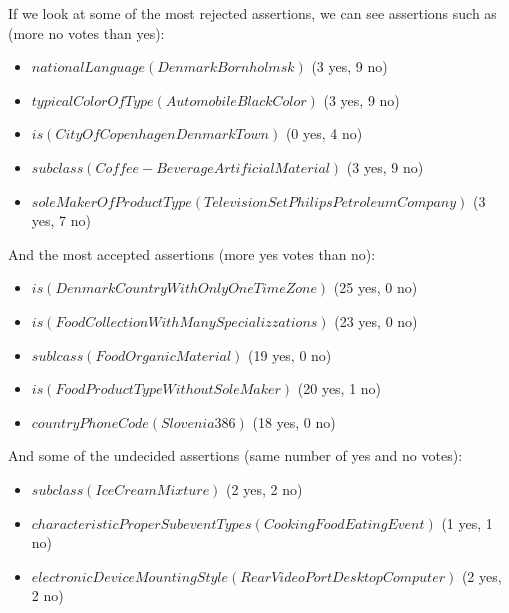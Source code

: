 {If we look at some of the most rejected assertions, we can see assertions 
such as (more no votes than yes):
\begin{itemize}
\item $nationalLanguage (Denmark Bornholmsk)$ (3 yes, 9 no)
\item $typicalColorOfType (Automobile BlackColor)$ (3 yes, 9 no)
\item $is (CityOfCopenhagenDenmark Town)$ (0 yes, 4 no)
\item $subclass (Coffee-Beverage ArtificialMaterial)$ (3 yes, 9 no)
\item $soleMakerOfProductType (TelevisionSet PhilipsPetroleumCompany)$ (3 yes, 7 no)
\end{itemize}
And the most accepted assertions (more yes votes than no):
\begin{itemize}
\item $is (Denmark CountryWithOnlyOneTimeZone)$ (25 yes, 0 no)
\item $is (Food CollectionWithManySpecializzations)$ (23 yes, 0 no)
\item $sublcass (Food OrganicMaterial)$ (19 yes, 0 no)
\item $is (Food ProductTypeWithoutSoleMaker)$ (20 yes, 1 no)
\item $countryPhoneCode (Slovenia 386)$ (18 yes, 0 no)
\end{itemize}
And some of the undecided assertions (same number of yes and no votes):
\begin{itemize}
\item $subclass (IceCream Mixture)$ (2 yes, 2 no)
\item $characteristicProperSubeventTypes (CookingFood EatingEvent)$ (1 yes, 1 no)
\item $electronicDeviceMountingStyle (RearVideoPort DesktopComputer)$ (2 yes, 2 no)
\end{itemize}

}
